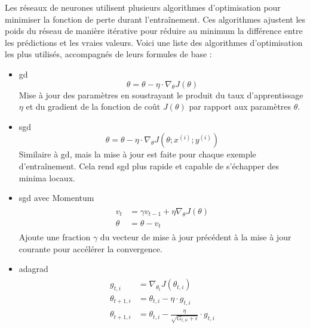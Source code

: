 Les réseaux de neurones utilisent plusieurs algorithmes d'optimisation pour minimiser la fonction de perte durant l'entraînement. Ces algorithmes ajustent les poids du réseau de manière itérative pour réduire au minimum la différence entre les prédictions et les vraies valeurs. Voici une liste des algorithmes d'optimisation les plus utilisés, accompagnés de leurs formules de base \cite{ruder2016overview, Goodfellow-et-al-2016} :

\begin{itemize}
    \item \acf{gd}
    \begin{equation}
        \theta = \theta - \eta \cdot \nabla_\theta J( \theta)
    \end{equation}
    Mise à jour des paramètres en soustrayant le produit du taux d'apprentissage \( \eta \) et du gradient de la fonction de coût \( J(\theta) \) par rapport aux paramètres \( \theta \).

    \item \acf{sgd}
    \begin{equation}
        \theta = \theta - \eta \cdot \nabla_\theta J( \theta; x^{(i)}; y^{(i)})
    \end{equation}
    Similaire à \ac{gd}, mais la mise à jour est faite pour chaque exemple d'entraînement. Cela rend \ac{sgd} plus rapide et capable de s'échapper des minima locaux.
    
    \item \acf{sgd} avec Momentum
    \begin{align}
    \begin{split}
        v_t &= \gamma v_{t-1} + \eta \nabla_\theta J( \theta)\\
        \theta &= \theta - v_t
    \end{split}
    \end{align}
    Ajoute une fraction \( \gamma \) du vecteur de mise à jour précédent à la mise à jour courante pour accélérer la convergence.
    
    \item \acf{adagrad}
    \begin{align}
    \begin{split}
        g_{t, i} &= \nabla_{\theta_t} J( \theta_{t,i} ) \\
        \theta_{t+1, i} &= \theta_{t, i} - \eta \cdot g_{t, i} \\
        \theta_{t+1, i} &= \theta_{t, i} - \frac{\eta}{\sqrt{G_{t, ii} + \epsilon}} \cdot g_{t, i}
    \end{split}
    \end{align}
    

\end{itemize}
